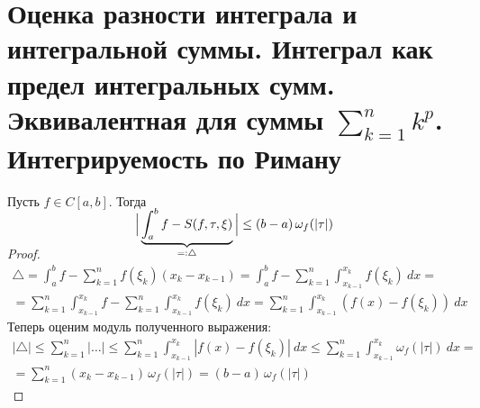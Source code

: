 \section{Оценка разности интеграла и интегральной суммы. Интеграл как предел интегральных сумм. Эквивалентная для суммы $\sum_{k=1}^n k^p$. Интегрируемость по Риману}
\begin{theorem}
    Пусть $f \in C[a, b]$. Тогда
    \begin{equation*}
    \smash{\Big{|} \underbrace{\int_{a}^{b} f - S(f, \tau, \xi)}_
    {=: \triangle}\Big{|}}
    \leq (b - a)\, \omega_f (|\tau|)
    \end{equation*}
\end{theorem}
\begin{proof}
  \begin{equation*}
    \begin{gathered}
      \triangle = \int_{a}^{b} f - \sum_{k = 1}^{n} f (\xi_k)
      (x_k - x_{k - 1}) = \int_{a}^{b} f - \sum_{k = 1}^{n}
      \int_{x_{k - 1}}^{x_k} f(\xi_k) \: dx
      = \\ =
      \sum_{k = 1}^{n} \int_{x_{k - 1}}^{x_k} f -
      \sum_{k = 1}^{n} \int_{x_{k - 1}}^{x_k} f(\xi_k) \: dx =
      \sum_{k = 1}^{n} \int_{x_{k - 1}}^{x_k} (f(x) - f(\xi_k)) \: dx
    \end{gathered}
  \end{equation*}
  Теперь оценим модуль полученного выражения:
  \begin{equation*}
    \begin{gathered}
      |\triangle| \leq \sum_{k = 1}^{n} \Big| \dotso \Big| \leq
      \sum_{k = 1}^{n} \int_{x_{k - 1}}^{x_k} |f(x) - f(\xi_k)| \: dx \leq
      \sum_{k = 1}^{n} \int_{x_{k - 1}}^{x_k} \omega_f(|\tau|) \: dx
      = \\ =
      \sum_{k = 1}^{n} (x_k - x_{k - 1})\, \omega_f(|\tau|) = (b - a)\, \omega_f(|\tau|)
    \end{gathered}
  \end{equation*}
\end{proof}

